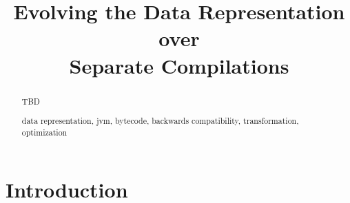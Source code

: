 \documentclass[runningheads,a4paper]{style/llncs}
\newcommand{\keywords}[1]{\par\addvspace\baselineskip
\noindent\keywordname\enspace\ignorespaces#1}
\begin{document}
\mainmatter  %

\title{Evolving the Data Representation over\\Separate Compilations}
\maketitle


\begin{abstract}
TBD
\keywords{data representation, jvm, bytecode, backwards compatibility, transformation, optimization}
\end{abstract}

\section{Introduction}



\end{document}
